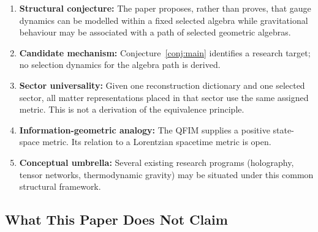 \documentclass[12pt,a4paper]{article}
\begin{document}
\begin{enumerate}
    \item \textbf{Structural conjecture:} The paper proposes, rather than proves, that gauge dynamics can be modelled within a fixed selected algebra while gravitational behaviour may be associated with a path of selected geometric algebras.
    
    \item \textbf{Candidate mechanism:} Conjecture~\ref{conj:main} identifies a research target; no selection dynamics for the algebra path is derived.
    
    \item \textbf{Sector universality:} Given one reconstruction dictionary and one selected sector, all matter representations placed in that sector use the same assigned metric.  This is not a derivation of the equivalence principle.
    
    \item \textbf{Information-geometric analogy:} The QFIM supplies a positive state-space metric.  Its relation to a Lorentzian spacetime metric is open.
    
    \item \textbf{Conceptual umbrella:} Several existing research programs (holography, tensor networks, thermodynamic gravity) may be situated under this common structural framework.
\end{enumerate}

\subsection{What This Paper Does Not Claim}
\end{document}
